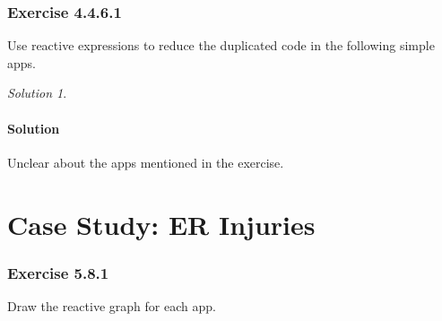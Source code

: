 \documentclass[
]{book}
\theoremstyle{definition}
\theoremstyle{definition}
\theoremstyle{definition}
\theoremstyle{definition}
\theoremstyle{remark}
\newtheorem*{solution}{Solution}
\begin{document}
\hypertarget{exercise-4.4.6.1}{%
\subsection*{Exercise 4.4.6.1}\label{exercise-4.4.6.1}}

Use reactive expressions to reduce the duplicated code in the following simple
apps.

\begin{solution}
\leavevmode

\hypertarget{solution-17}{%
\subsubsection*{Solution}\label{solution-17}}

Unclear about the apps mentioned in the exercise.

\end{solution}

\hypertarget{case-study-er-injuries}{%
\chapter{Case Study: ER Injuries}\label{case-study-er-injuries}}

\hypertarget{exercise-5.8.1}{%
\subsection*{Exercise 5.8.1}\label{exercise-5.8.1}}

Draw the reactive graph for each app.
\end{document}
